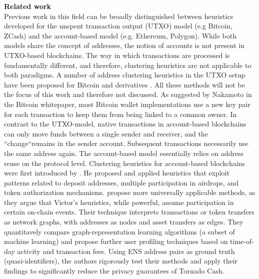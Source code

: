 \documentclass[12pt,a4paper,titlepage,oneside,english]{article}
\begin{document}
\textbf{Related work}\\
Previous work in this field can be broadly distinguished between heuristics developed for the unspent transaction output (UTXO) model (e.g Bitcoin, ZCash) and the account-based model (e.g. Ethereum, Polygon). While both models share the concept of addresses, the notion of accounts is not present in UTXO-based blockchains. The way in which transactions are processed is fundamentally different, and therefore, clustering heuristics are not applicable to both paradigms.
A number of address clustering heuristics in the UTXO setup have been proposed for Bitcoin and derivatives \citep{Androulaki2013, Meiklejohn2013, Haslhofer2016, jourdan2018, kappos2022}. All these methods will not be the focus of this work and therefore not discussed. As suggested by Nakamoto in the Bitcoin whitepaper, most Bitcoin wallet implementations use a new key pair for each transaction to keep them from being linked to a common owner. \newline
In contrast to the UTXO-model, native transactions in account-based blockchains can only move funds between a single sender and receiver, and the ``change``remains in the sender account. Subsequent transactions necessarily use the same address again. The account-based model essentially relies on address reuse on the protocol level. \citep{Beres2020} \newline
Clustering heuristics for account-based blockchains were first introduced by \cite{FV:17}. He proposed and applied heuristics that exploit patterns related to deposit addresses, multiple participation in airdrops, and token authorization mechanisms. \newline
\cite{Beres2020} propose more universally applicable methods, as they argue that Victor’s heuristics, while powerful, assume participation in certain on-chain events. Their technique interprets transactions or token transfers as network graphs, with addresses as nodes and asset transfers as edges. They quantitavely compare graph-representation learning algorithms (a subset of machine learning) and propose further user profiling techniques based on time-of-day activity and transaction fees. Using ENS address pairs as ground truth (quasi-identifiers), the authors rigorously test their methods and apply their findings to significantly reduce the privacy guarantees of Tornado Cash. \newline
\end{document}
